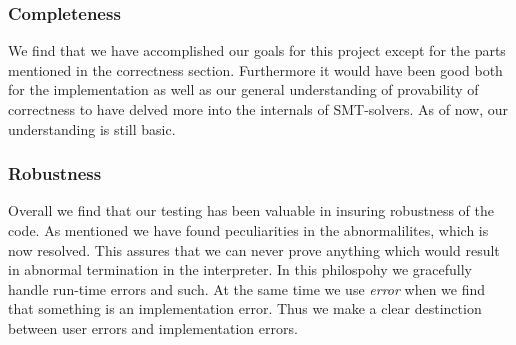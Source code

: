 \subsubsection{Completeness}
We find that we have accomplished our goals for this project except for the parts mentioned in the correctness section.
Furthermore it would have been good both for the implementation as well as our general understanding of provability of correctness to have delved more into the internals of SMT-solvers.
As of now, our understanding is still basic.

\subsubsection{Robustness}
Overall we find that our testing has been valuable in insuring robustness of the code. As mentioned we have found peculiarities in the abnormalilites, which is now resolved. 
This assures that we can never prove anything which would result in abnormal termination in the interpreter. 
In this philospohy we gracefully handle run-time errors and such. 
At the same time we use \textit{error} when we find that something is an implementation error. 
Thus we make a clear destinction between user errors and implementation errors.


